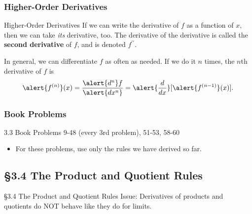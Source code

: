 \documentclass[cal1spr16Lectures.tex]{subfiles}
\begin{document}
\subsubsection{Higher-Order Derivatives}

\begin{frame}{\small Higher-Order Derivatives}
If we can write the derivative of $f$ as a function of $x$, then we can take \emph{its} derivative, too.  The derivative of the derivative is called the {\bf second derivative} of $f$, and is denoted $f^{\prime\prime}$.  

\vspace{1pc}
In general, we can differentiate $f$ as often as needed.  If we do it $n$ times, the $n$th derivative of $f$ is 
\[\alert{f^{(n)}}(x)=\frac{\alert{d^n} f}{\alert{dx^n}}=\alert{\frac{d}{dx}}[\alert{f^{(n-1)}}(x)].\]
\end{frame}

\subsubsection{Book Problems}

\begin{frame}{}
\begin{block}{3.3 Book Problems} 9-48 (every 3rd problem), 51-53, 58-60 \end{block} 
\begin{itemize}
\item For these problems, use only the rules we have derived so far.
\end{itemize}
\end{frame}

\subsection[3.4 The Product and Quotient Rules]{\S 3.4 The Product and Quotient Rules}

\begin{frame}{\S 3.4 The Product and Quotient Rules}
Issue: Derivatives of products and quotients do \alert{NOT} behave like they do for limits.  
\end{frame}
\end{document}
